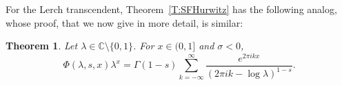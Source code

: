 \documentclass[11pt,a4paper]{amsart}
\newcommand{\C}{\mathbb{C}}
\theoremstyle{plain}
\newtheorem{theorem}{Theorem}
\theoremstyle{plain}
\theoremstyle{plain}
\theoremstyle{remark}
\begin{document}

For the Lerch transcendent, Theorem~\ref{T:SFHurwitz} has the following analog, whose proof, that we now give in more detail, is similar:

\begin{theorem}
\label{T:SFHurwitzLerch}
Let $\lambda\in \C\setminus\{0,1\}$. For $x\in (0,1]$ and $\sigma<0$,
\begin{equation}
\label{eq:SFHurwitzLerch}
  \Phi(\lambda,s,x)\lambda^x = \Gamma(1-s)\sum_{k=-\infty}^\infty\frac{e^{2\pi ikx}}{(2\pi i k -\log\lambda)^{1-s}}.
\end{equation}
\end{theorem}
\end{document}
